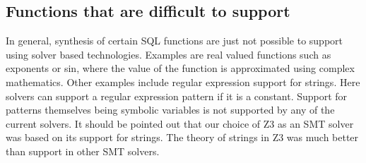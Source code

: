 \subsection{Functions that are difficult to support}
In general, synthesis of certain SQL functions are just not possible to support using solver based technologies.  Examples are real valued functions such as exponents or sin, where the value of the function is approximated using complex mathematics.  Other examples include regular expression support for strings.  Here solvers can support a regular expression pattern if it is a constant.  Support for patterns themselves being symbolic variables is not supported by any of the current solvers.  It should be pointed out that our choice of Z3 as an SMT solver was based on its support for strings.  The theory of strings in Z3 was much better than support in other SMT solvers.
